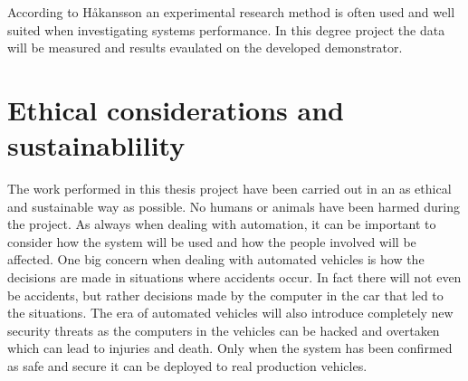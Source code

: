 According to Håkansson \cite{haakansson2013portal} an experimental research method is often used and well suited when investigating systems performance. In this degree project the data will be measured and results evaulated on the developed demonstrator.


\section{Ethical considerations and sustainablility}
The work performed in this thesis project have been carried out in an as ethical and sustainable way as possible. No humans or animals have been harmed during the project. As always when dealing with automation, it can be important to consider how the system will be used and how the people involved will be affected. One big concern when dealing with automated vehicles is how the decisions are made in situations where accidents occur. In fact there will not even be accidents, but rather decisions made by the computer in the car that led to the situations. The era of automated vehicles will also introduce completely new security threats as the computers in the vehicles can be hacked and overtaken which can lead to injuries and death. Only when the system has been confirmed as safe and secure it can be deployed to real production vehicles.